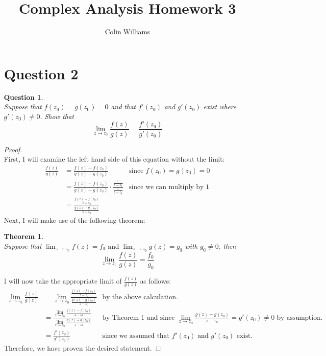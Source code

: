 \documentclass[10pt,a4paper]{article}
\title{Complex Analysis Homework 3}
\author{Colin Williams}
\newtheorem*{question*}{Question}
\newtheorem{theorem}{Theorem}
\begin{document}
\maketitle
\section*{Question 2}
\begin{question*}{$ $}
\\Suppose that $f(z_0) = g(z_0) = 0$ and that $f'(z_0)$ and $g'(z_0)$ exist where $g'(z_0) \neq 0$. Show that
\[\lim_{z \to z_0}\frac{f(z)}{g(z)} = \frac{f'(z_0)}{g'(z_0)}\]
\end{question*}
\begin{proof}{$ $}
\\First, I will examine the left hand side of this equation without the limit:
\begin{align*}
\frac{f(z)}{g(z)} &= \frac{f(z) - f(z_0)}{g(z) - g(z_0)} &\text{since } f(z_0) = g(z_0) = 0\\
&= \frac{f(z) - f(z_0)}{g(z) - g(z_0)} \cdot \frac{\displaystyle \frac{1}{z - z_0}}{\displaystyle \frac{1}{z - z_0}} &\text{since we can multiply by 1}\\
&= \frac{\displaystyle \frac{f(z) - f(z_0)}{z - z_0}}{\displaystyle \frac{g(z) - g(z_0)}{z - z_0}}
\end{align*}
Next, I will make use of the following theorem:
\begin{theorem}{$ $}
\\Suppose that $\displaystyle \lim_{z \to z_0}f(z) = f_0 \text{ and } \lim_{z \to z_0}g(z) = g_0$ with $g_0 \neq 0$, then
\[\lim_{z \to z_0}\frac{f(z)}{g(z)} = \frac{f_0}{g_0}\]
\end{theorem}
I will now take the appropriate limit of $\displaystyle \frac{f(z)}{g(z)}$ as follows:
\begin{align*}
\lim_{z \to z_0} \frac{f(z)}{g(z)} &= \lim_{z \to z_0} \frac{\displaystyle \frac{f(z) - f(z_0)}{z - z_0}}{\displaystyle \frac{g(z) - g(z_0)}{z - z_0}} &\text{by the above calculation.}\\
&= \frac{\displaystyle \lim_{z \to z_0} \frac{f(z) - f(z_0)}{z - z_0}}{\displaystyle \lim_{z \to z_0} \frac{g(z) - g(z_0)}{z - z_0}} &\text{by Theorem 1 and since } \lim_{z \to z_0}\frac{g(z) - g(z_0)}{z - z_0} = g'(z_0) \neq 0 \text{ by assumption}.\\
&= \frac{f'(z_0)}{g'(z_0)} &\text{since we assumed that } f'(z_0) \text{ and } g'(z_0) \text{ exist.}
\end{align*}
Therefore, we have proven the desired statement.
\end{proof}
\end{document}
